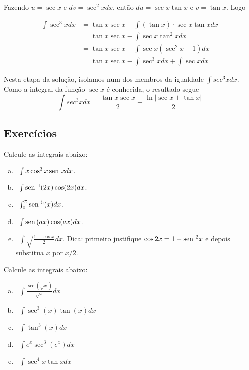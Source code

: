 	Fazendo $u = \sec x$ e $dv = \sec^2xdx$, então $du = \sec x \tan x$ e $v = \tan x$. Logo
	
	\[\begin{split}
		\int \sec^3xdx & = \tan x \sec x - \int (\tan x) \cdot \sec x \tan x dx \\ 
		& = \tan x \sec x - \int \sec x \tan^2xdx \\
		& = \tan x \sec x - \int \sec x (\sec^2x -1)dx \\
		& = \tan x \sec x - \int \sec^3xdx + \int\sec xdx
	\end{split}\]
	
	Nesta etapa da solução, isolamos num dos membros da igualdade $\int sec^3xdx$. Como a integral da função $\sec x$ é conhecida, o resultado segue $$ \int sec^3xdx = \frac{\tan x \sec x }{2} + \frac{\ln \left| \sec x + \tan x \right|}{2}$$  

\subsection*{Exercícios}

	\begin{exer}
		Calcule as integrais abaixo:
		\begin{enumerate}[a)]
			\item~$\int x \cos^3x \operatorname{sen}\, xdx$.
			\item~$ \int \operatorname{sen}\,^4(2x)\cos(2x)dx$.
			\item~$\int_{0}^{\pi} \operatorname{sen}\,^5(x)dx $.
			\item~$\int \operatorname{sen}\,(ax) \cos(ax)dx$.
			\item~$\int \sqrt{\frac{1-\cos x}{2}}dx$. Dica: primeiro justifique $\cos2x = 1 - \operatorname{sen}\,^2x$ e depois substitua $x$ por $x/2$.  
		\end{enumerate}
	\end{exer}
	\newpage
	\begin{exer}
		Calcule as integrais abaixo:
		\begin{enumerate}[a)]
			\item~$\int \frac{\sec(\sqrt x)}{\sqrt x}dx$
			\item~$\int \sec^3(x) \tan(x)dx $
			\item~$\int \tan^3(x)dx $
			\item~$\int e^x \sec^3(e^x)dx$
			\item~$\int \sec^4x \tan xdx$
		\end{enumerate}
	\end{exer}



